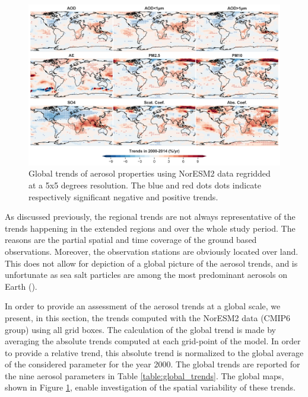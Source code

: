 \documentclass[journal abbreviation, manuscript]{copernicus}
\begin{document}
\begin{figure}[t]
 \includegraphics[width=16cm]{../scripts/figs/trends_map2.png}
 \caption{Global trends of aerosol properties using NorESM2 data regridded at a 5x5 degrees resolution. The blue and red dots dots indicate respectively significant negative and positive trends.}
 \label{fig:global_trends}
\end{figure}

As discussed previously, the regional trends are not always representative of the trends happening in the extended regions and over the whole study period. The reasons are the partial spatial and time coverage of the ground based observations. Moreover, the observation stations are obviously located over land. This does not allow for depiction of a global picture of the aerosol trends, and is unfortunate as sea salt particles are among the most predominant aerosols on Earth (\cite{schulz2004sea}).

In order to provide an assessment of the aerosol trends at a global scale, we present, in this section, the trends computed with the NorESM2 data (CMIP6 group) using all grid boxes. The calculation of the global trend is made by averaging the absolute trends computed at each grid-point of the model. In order to provide a relative trend, this absolute trend is normalized to the global average of the considered parameter for the year 2000. The global trends are reported for the nine aerosol parameters in Table \ref{table:global_trends}. The global maps, shown in Figure \ref{fig:global_trends}, enable investigation of the spatial variability of these trends.
\end{document}
